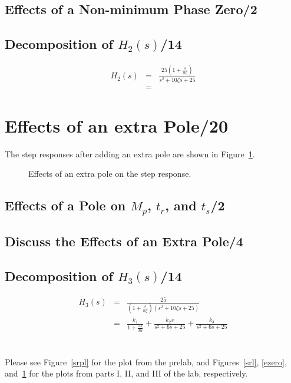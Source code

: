 \documentclass{article}
\newcommand{\score}{\hfill \underline{\hspace{1cm}}/}
\begin{document}
\subsection{Effects of a Non-minimum Phase Zero\score 2}


\subsection{Decomposition of $H_2(s)$\score 14}
\begin{eqnarray*}
H_2(s) &=& \frac{25 \left( 1+\frac{s}{\alpha \zeta} \right)}{s^2+10\zeta s +25}\\
&=& 
\end{eqnarray*}



\section{{\sc Effects of an extra Pole}\score 20}
The step responses after adding an extra pole are shown in Figure~\ref{epole}.

\begin{figure}[htbp]
\centering
\caption{Effects of an extra pole on the step response.}
\label{epole}
\end{figure}

\subsection{Effects of a Pole on $M_p$, $t_r$, and $t_s$\score 2}

%

\subsection{Discuss the Effects of an Extra Pole\score 4}


\subsection{Decomposition of $H_3(s)$\score 14}
\begin{eqnarray*}
H_3(s) &=& \frac{25}{\left(1+\frac{s}{\alpha \zeta}\right)\left( s^2 + 10 \zeta s + 25\right) } \\
&=& \frac{k_1}{1+\frac{5s}{3\alpha}} + \frac{k_2 s}{s^2+6s+25} + \frac{k_3}{s^2+6s+25}
\end{eqnarray*}


\section*{}
Please see Figure~\ref{srpl} for the plot from the prelab, and Figures~\ref{srl}, \ref{ezero}, and~\ref{epole} for the plots from parts I, II, and III of the lab, respectively.
\end{document}
